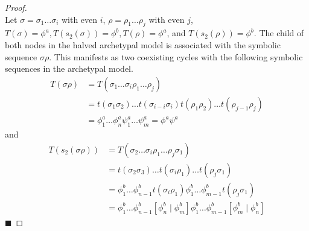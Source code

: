 \begin{proof} \phantom{x} \\
	Let $\sigma = \sigma_1 \dots \sigma_i$ with even $i$, $\rho = \rho_1 \dots \rho_j$ with even $j$, $T(\sigma) = \phi^a, T(s_2(\sigma)) = \phi^b, T(\rho) = \phi^a$, and $T(s_2(\rho)) = \phi^b$.
	The child of both nodes in the halved archetypal model is associated with the symbolic sequence $\sigma\rho$.
	This manifests as two coexisting cycles with the following symbolic sequences in the archetypal model.
	\begin{align*}
		T(\sigma\rho) & = T(\sigma_1 \dots \sigma_i \rho_1 \dots \rho_j)                                              \\
		              & = t(\sigma_1\sigma_2) \dots t(\sigma_{i-i}\sigma_i) t(\rho_1\rho_2) \dots t(\rho_{j-1}\rho_j) \\
		              & = \phi^a_1 \dots \phi^a_n \psi^a_1 \dots \psi^a_m = \phi^a\psi^a
	\end{align*}
	and
	\begin{align*}
		T(s_2(\sigma\rho)) & = T(\sigma_2 \dots \sigma_i \rho_1 \dots \rho_j \sigma_1)                                                                         \\
		                   & = t(\sigma_2\sigma_3) \dots t(\sigma_i\rho_1) \dots t(\rho_j\sigma_1)                                                             \\
		                   & = \phi^b_1 \dots \phi^b_{n-1} t(\sigma_i\rho_1) \phi^b_1 \dots \phi^b_{m-1} t(\rho_j\sigma_1)                                     \\
		                   & = \phi^b_1 \dots \phi^b_{n-1} \left[\phi^b_n \mid \phi^b_m\right] \phi^b_1 \dots \phi^b_{m-1} \left[\phi^b_m \mid \phi^b_n\right]
	\end{align*}
	\hfill $\blacksquare$
\end{proof}
